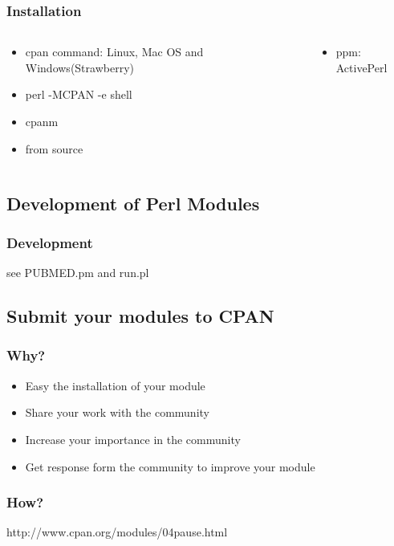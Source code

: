 \documentclass[UTF8]{beamer}
\begin{document}
\begin{frame}
  \frametitle{Installation}
\begin{columns}
  \begin{column}{.5\textwidth}
    \begin{itemize}
      \item cpan command: Linux, Mac OS and Windows(Strawberry)
      \item perl -MCPAN -e shell
      \item cpanm
      \item from source
    \end{itemize}
  \end{column}
  \begin{column}{.5\textwidth}
    \begin{itemize}
      \item ppm: ActivePerl
    \end{itemize}
  \end{column}
\end{columns}
\end{frame}



\subsection{Development of Perl Modules}

\begin{frame}
  \frametitle{Development}
  see PUBMED.pm and run.pl
\end{frame}

\subsection{Submit your modules to CPAN}

\begin{frame}
  \frametitle{Why?}
  \begin{itemize}
    \item Easy the installation of your module
    \item Share your work with the community
    \item Increase your importance in the community
    \item Get response form the community to improve your module
  \end{itemize}
\end{frame}

\begin{frame}
  \frametitle{How?}
  http://www.cpan.org/modules/04pause.html
\end{frame}
\end{document}
